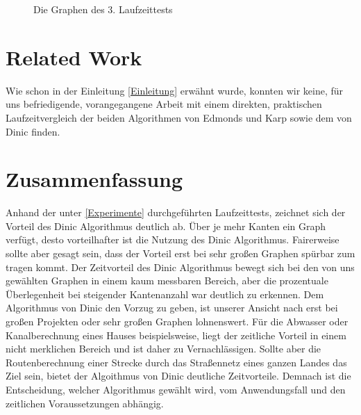 \documentclass[a4paper]{llncs}
\begin{document}
\begin{figure}[H]
\label{fig:testgraph3}
\caption{Die Graphen des 3. Laufzeittests} 
\end{figure}

\citep{FordFulkOnline}

\section{Related Work}
\label{Related Work}
Wie schon in der Einleitung \ref{Einleitung} erwähnt wurde, konnten wir keine, für uns befriedigende, vorangegangene Arbeit mit einem direkten, praktischen Laufzeitvergleich der beiden Algorithmen von Edmonds und Karp sowie dem von Dinic finden.

\section{Zusammenfassung}
\label{Zusammenfassung}
Anhand der unter \ref{Experimente} durchgeführten Laufzeittests, zeichnet sich der Vorteil des Dinic Algorithmus deutlich ab. Über je mehr Kanten ein Graph verfügt, desto vorteilhafter ist die Nutzung des Dinic Algorithmus. Fairerweise sollte aber gesagt sein, dass der Vorteil erst bei sehr großen Graphen spürbar zum tragen kommt. Der Zeitvorteil des Dinic Algorithmus bewegt sich bei den von uns gewählten Graphen in einem kaum messbaren Bereich, aber die prozentuale Überlegenheit bei steigender Kantenanzahl war deutlich zu erkennen. Dem Algorithmus von Dinic den Vorzug zu geben, ist unserer Ansicht nach erst bei großen Projekten oder sehr großen Graphen lohnenswert. Für die Abwasser oder Kanalberechnung eines Hauses beispielsweise, liegt der zeitliche Vorteil in einem nicht merklichen Bereich und ist daher zu Vernachlässigen. Sollte aber die Routenberechnung einer Strecke durch das Straßennetz eines ganzen Landes das Ziel sein, bietet der Algoithmus von Dinic deutliche Zeitvorteile. Demnach ist die Entscheidung, welcher Algorithmus gewählt wird, vom Anwendungsfall und den zeitlichen Voraussetzungen abhängig.


 

%
\end{document}
